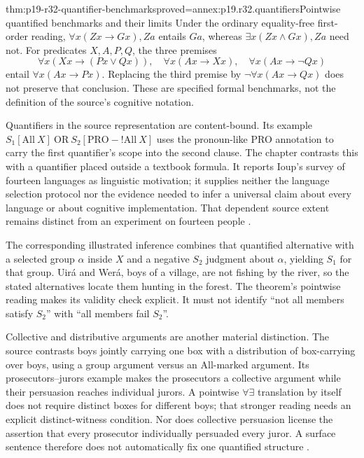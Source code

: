 \begin{hbtheorem}{thm:p19-r32-quantifier-benchmarks}{proved=annex:p19.r32.quantifiers}{Pointwise quantified benchmarks and their limits}
Under the ordinary equality-free first-order reading,
\(\forall x(Zx\to Gx),Za\) entails \(Ga\), whereas
\(\exists x(Zx\land Gx),Za\) need not.
For predicates \(X,A,P,Q\), the three premises
\[
 \forall x(Xx\to(Px\lor Qx)),\quad
 \forall x(Ax\to Xx),\quad \forall x(Ax\to\neg Qx)
\]
entail \(\forall x(Ax\to Px)\).
Replacing the third premise by \(\neg\forall x(Ax\to Qx)\)
does not preserve that conclusion. These are specified formal
benchmarks, not the definition of the source's cognitive notation.
\end{hbtheorem}

Quantifiers in the source representation are content-bound. Its example
\(S_1[\mathrm{All}\ X]\ \mathrm{OR}\ S_2[\mathrm{PRO\!-!All}\ X]\)
uses the pronoun-like PRO annotation to carry the first quantifier's scope
into the second clause. The chapter contrasts this with a quantifier
placed outside a textbook formula. It reports Ioup's survey of fourteen
languages as linguistic motivation; it supplies neither the language
selection protocol nor the evidence needed to infer a universal claim
about every language or about cognitive implementation. That dependent
source extent remains distinct from an experiment on fourteen people
\cite[p.~217]{OBrien2021NaturalLogic}.

The corresponding illustrated inference combines that quantified
alternative with a selected group \(\alpha\) inside \(X\) and a
negative \(S_2\) judgment about \(\alpha\), yielding \(S_1\) for that
group. Uirá and Werá, boys of a village, are not fishing by the river, so
the stated alternatives locate them hunting in the forest. The theorem's
pointwise reading makes its validity check explicit. It must not identify
``not all members satisfy \(S_2\)'' with ``all members fail \(S_2\)''.

Collective and distributive arguments are another material distinction.
The source contrasts boys jointly carrying one box with a distribution
of box-carrying over boys, using a group argument versus an All-marked
argument. Its prosecutors--jurors example makes the prosecutors a
collective argument while their persuasion reaches individual jurors.
A pointwise \(\forall\exists\) translation by itself does not require
distinct boxes for different boys; that stronger reading needs an
explicit distinct-witness condition. Nor does collective persuasion
license the assertion that every prosecutor individually persuaded
every juror. A surface sentence therefore does not automatically fix
one quantified structure \cite[pp.~217--218]{OBrien2021NaturalLogic}.

